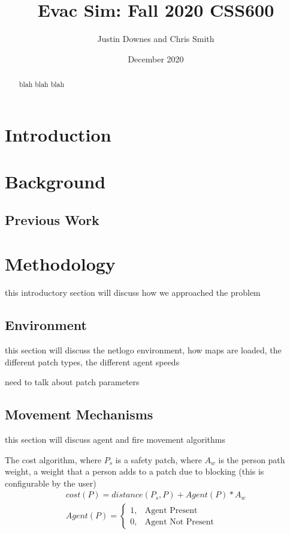 \documentclass[12pt,letterpaper]{article}
\begin{document}
\title{Evac Sim: Fall 2020 CSS600 }

\author{Justin Downes and Chris Smith}
\date{December 2020}
\maketitle

\begin{abstract}
blah blah blah

\end{abstract}
\section {Introduction}



\section {Background}
\subsection{Previous Work}
\cite{almeidaCrowdSimulationModeling2013} 
\cite{kneidl}
\cite{kuligowskil}
\cite{abmEvac}
\cite{zhouSimulationPedestrianEvacuation2019}

\section {Methodology}
this introductory section will discuss how we approached the problem
\subsection{Environment}
this section will discuss the netlogo environment, how maps are loaded, the different patch types, the different agent speeds

need to talk about patch parameters
\subsection{Movement Mechanisms}
this section will discuss agent and fire movement algorithms

The cost algorithm, where $P_s$ is a safety patch, where $A_w$ is the person path weight, a weight that a person adds to a patch due to blocking (this is configurable by the user)
\begin{align}
cost(P)  = distance(P_s, P) + Agent(P) * A_w \nonumber \\
Agent(P)=
\begin{cases}
1, & \text{Agent Present}  \\
0, & \text{Agent Not Present} 
\end{cases}
\end{align}
\end{document}
